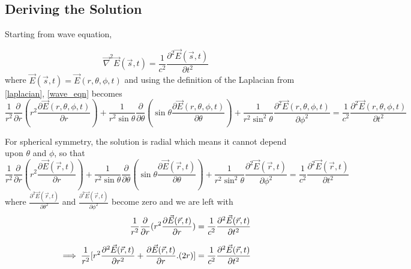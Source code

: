 \subsection{Deriving the Solution}

Starting from wave equation,

   \begin{equation}\label{wave_eqn}
   \vec{\nabla}^2\vec{E}(\vec{s},t) =  \frac{1}{c^2}\frac{\partial^2\vec{E}(\vec{s},t)}{\partial t^2}
   \end{equation}
%
where
%
$\vec{E}(\vec{s},t) = \vec{E}(r,\theta,\phi,t)$
and using the definition of the Laplacian from \eqref{laplacian}, \eqref{wave_eqn} becomes
%
   \begin{equation}
   \frac{1}{r^2}\frac{\partial}{\partial r}(r^2\frac{\partial\vec{E}(r,\theta,\phi,t) }{\partial r})+\frac{1}{r^2\sin\theta}\frac{\partial}{\partial\theta}(\sin\theta\frac{\partial \vec{E}(r,\theta,\phi,t)}{\partial \theta})+\frac{1}{r^2\sin^2\theta}\frac{\partial^2\vec{E}(r,\theta,\phi,t)}{\partial \phi^2} = \frac{1}{c^2}\frac{\partial^2\vec{E}(r,\theta,\phi,t)}{\partial t^2}
   \end{equation}

   For spherical symmetry, the solution is radial which means it cannot depend upon $\theta$ and $\phi$, so that
%
   \begin{equation}
   \frac{1}{r^2}\frac{\partial}{\partial r}(r^2\frac{\partial\vec{E}(\vec{r},t) }{\partial r})+\frac{1}{r^2\sin\theta}\frac{\partial}{\partial\theta}(\sin\theta\frac{\partial \vec{E}(\vec{r},t)}{\partial \theta})+\frac{1}{r^2\sin^2\theta}\frac{\partial^2\vec{E}(\vec{r},t)}{\partial \phi^2} = \frac{1}{c^2}\frac{\partial^2\vec{E}(\vec{r},t)}{\partial t^2}
   \end{equation}
%
where $\displaystyle \frac{\partial^2\vec{E}(\vec{r},t)}{\partial \theta^2}$ and $\displaystyle \frac{\partial^2\vec{E}(\vec{r},t)}{\partial \phi^2}$ become zero and we are left with
%
   \begin{equation}\label{wave_eqn_1}
   \begin{aligned}
      \frac{1}{r^2}\frac{\partial}{\partial r}(r^2\frac{\partial\vec{E}(\vec{r},t) }{\partial r}) = \frac{1}{c^2}\frac{\partial^2\vec{E}(\vec{r},t)}{\partial t^2}\\[0.5\baselineskip]
      \implies \frac{1}{r^2}[r^2\frac{\partial^2\vec{E}(\vec{r},t)}{\partial r^2}+\frac{\partial\vec{E}(\vec{r},t) }{\partial r}.(2r)] = \frac{1}{c^2}\frac{\partial^2\vec{E}(\vec{r},t)}{\partial t^2}
   \end{aligned}
   \end{equation}

